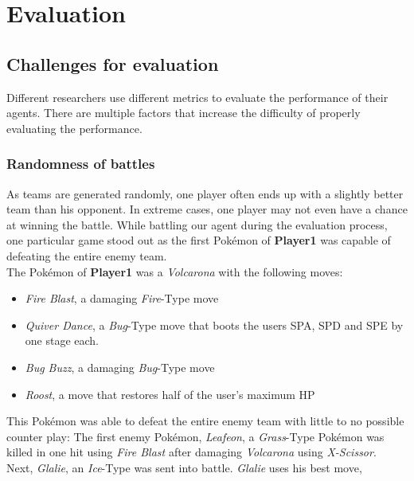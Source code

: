 
\chapter{Evaluation}
\label{ch:evaluation}

\section{Challenges for evaluation}
\label{sec:eval-challenges}

Different researchers use different metrics to evaluate the performance of their agents. 
There are multiple factors that increase the difficulty of properly evaluating the performance.

\subsection{Randomness of battles}
\label{sec:eval-challenges-randomness}
As teams are generated randomly, one player often ends up with a slightly better team than his opponent.
In extreme cases, one player may not even have a chance at winning the battle. While battling
our agent during the evaluation process, one particular game stood out as the first Pokémon of 
\textbf{Player1} was capable of defeating the entire enemy team. \\
The Pokémon of \textbf{Player1} was a \textit{Volcarona} with the following moves:
\begin{itemize}
    \item \textit{Fire Blast}, a damaging \textit{Fire}-Type move
    \item \textit{Quiver Dance}, a \textit{Bug}-Type move that boots the users \ac{SPA}, \ac{SPD} and 
    \ac{SPE} by one stage each.
    \item \textit{Bug Buzz}, a damaging \textit{Bug}-Type move
    \item \textit{Roost}, a move that restores half of the user's maximum \ac{HP}
\end{itemize}
This Pokémon was able to defeat the entire enemy team with little to no possible counter play:
The first enemy Pokémon, \textit{Leafeon}, a \textit{Grass}-Type Pokémon was killed in one hit using
\textit{Fire Blast} after damaging \textit{Volcarona} using \textit{X-Scissor}. \\
Next, \textit{Glalie}, an \textit{Ice}-Type was sent into battle. \textit{Glalie} uses his best move,
